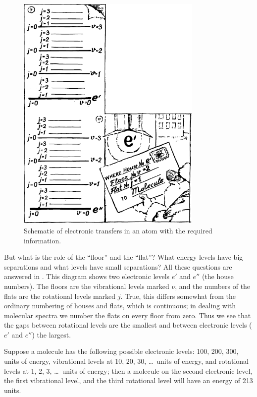 \begin{figure}[!ht]
\centering
\includegraphics[width=0.8\textwidth]{figures/fig-01-04.pdf}
\caption{Schematic of electronic transfers in an atom with the required information.}
\label{fig-1.4}
\end{figure}

But what is the role of the ``floor'' and the ``flat''? What energy levels have big separations and what levels have small separations? All these questions are answered in . This diagram shows two electronic levels $e'$ and $e''$ (the house numbers). The floors are the vibrational levels marked $\nu$, and the numbers of the flats are the rotational levels marked $j$. True, this differs somewhat from the ordinary numbering of houses and flats, which is continuous; in dealing with molecular spectra we number the flats on every floor from zero. Thus we see that the gaps between rotational levels are the smallest and between electronic levels ($e'$ and $e''$) the largest.

Suppose a molecule has the following possible electronic levels: 100, 200, 300, units of energy, vibrational levels at 10, 20, 30, \ldots\, units of energy, and rotational levels at 1, 2, 3, \ldots\, units of energy; then a molecule on the second electronic level, the first vibrational level, and the third rotational level will have an energy of 213 units.

